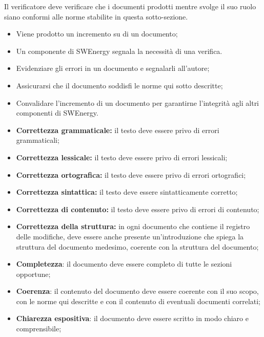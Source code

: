 \label{verifica-documento}

Il verificatore deve verificare che i documenti prodotti mentre svolge il suo
ruolo siano conformi alle norme stabilite in questa sotto-sezione.

\begin{itemize}
	\item Viene prodotto un incremento su di un documento;

	\item Un componente di SWEnergy segnala la necessità di una verifica.
\end{itemize}

\begin{itemize}
	\item Evidenziare gli errori in un documento e segnalarli all'autore;

	\item Assicurarsi che il documento soddisfi le norme qui sotto descritte;

	\item Convalidare l'incremento di un documento per garantirne l'integrità
	      agli altri componenti di SWEnergy.
\end{itemize}

\begin{itemize}
	\item \textbf{Correttezza grammaticale:} il testo deve essere privo di
	      errori grammaticali;

	\item \textbf{Correttezza lessicale:} il testo deve essere privo di errori
	      lessicali;

	\item \textbf{Correttezza ortografica:} il testo deve essere privo di errori
	      ortografici;

	\item \textbf{Correttezza sintattica:} il testo deve essere sintatticamente
	      corretto;

	\item \textbf{Correttezza di contenuto:} il testo deve essere privo di
	      errori di contenuto;

	\item \textbf{Correttezza della struttura:} in ogni documento che contiene
	      il registro delle modifiche, deve essere anche presente
	      un'introduzione che spiega la struttura del documento medesimo,
	      coerente con la struttura del documento;

	\item \textbf{Completezza}: il documento deve essere completo di tutte le
	      sezioni opportune;

	\item \textbf{Coerenza}: il contenuto del documento deve essere
	      coerente con il suo scopo, con le norme qui descritte e con il
	      contenuto di eventuali documenti correlati;

	\item \textbf{Chiarezza espositiva}: il documento deve essere
	      scritto in modo chiaro e comprensibile;
\end{itemize}

